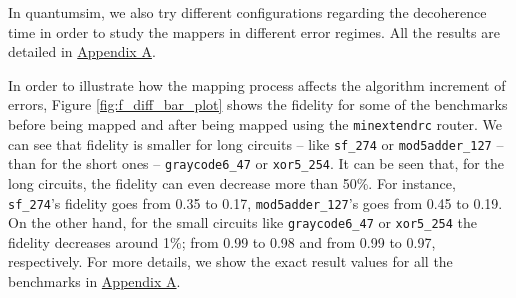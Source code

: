 In quantumsim, we also try different configurations regarding the decoherence time in order to study the mappers in different error regimes. 
All the results are detailed in \href{appendix-1.org}{Appendix A}.


In order to illustrate how the mapping process affects the algorithm increment of errors, Figure \ref{fig:f_diff_bar_plot} shows the fidelity for some of the benchmarks before being mapped and after being mapped using the \texttt{minextendrc} router.
We can see that fidelity is smaller for long circuits -- like \texttt{sf\_274} or \texttt{mod5adder\_127} -- than for the short ones -- \texttt{graycode6\_47} or \texttt{xor5\_254}.
It can be seen that, for the long circuits, the fidelity can even decrease more than 50\%.
For instance, \texttt{sf\_274}'s fidelity goes from 0.35 to 0.17, \texttt{mod5adder\_127}'s goes from 0.45 to 0.19.
On the other hand, for the small circuits like \texttt{graycode6\_47} or \texttt{xor5\_254} the fidelity decreases around 1\%; from 0.99 to 0.98 and from 0.99 to 0.97, respectively.
For more details, we show the exact result values for all the benchmarks in \href{appendix-1.org}{Appendix A}.

